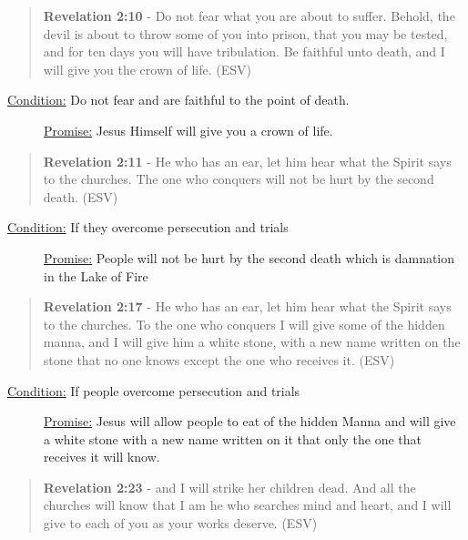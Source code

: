 \documentclass[11pt]{article}
\begin{document}
\begin{quote}
\textbf{Revelation 2:10} - Do not fear what you are about to suffer. Behold, the devil is about to throw some of you into prison, that you may be tested, and for ten days you will have tribulation. Be faithful unto death, and I will give you the crown of life. (ESV)
\end{quote}

\begin{description}
\item[{\uline{Condition:} Do not fear and are faithful to the point of death.}] \uline{Promise:} Jesus Himself will give you a crown of life.
\end{description}

\begin{quote}
\textbf{Revelation 2:11} - He who has an ear, let him hear what the Spirit says to the churches. The one who conquers will not be hurt by the second death. (ESV)
\end{quote}

\begin{description}
\item[{\uline{Condition:} If they overcome persecution and trials}] \uline{Promise:} People will not be hurt by the second death which is damnation in the Lake of Fire
\end{description}

\begin{quote}
\textbf{Revelation 2:17} - He who has an ear, let him hear what the Spirit says to the churches. To the one who conquers I will give some of the hidden manna, and I will give him a white stone, with a new name written on the stone that no one knows except the one who receives it. (ESV)
\end{quote}

\begin{description}
\item[{\uline{Condition:} If people overcome persecution and trials}] \uline{Promise:} Jesus will allow people to eat of the hidden Manna and will give a white stone with a new name written on it that only the one that receives it will know.
\end{description}

\begin{quote}
\textbf{Revelation 2:23} - and I will strike her children dead. And all the churches will know that I am he who searches mind and heart, and I will give to each of you as your works deserve. (ESV)
\end{quote}
\end{document}
